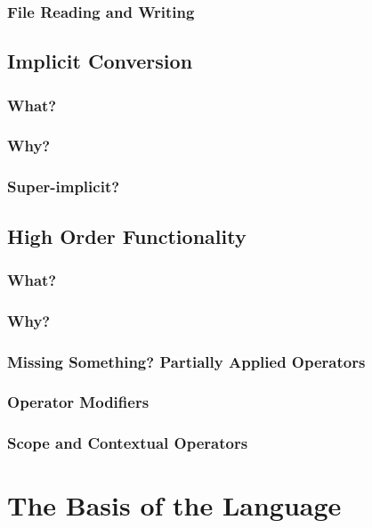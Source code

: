 \documentclass{article}
\let\oldsection\section
\renewcommand{\section}[2]{\oldsection{#1}\label{#2}}
\begin{document}
\subsubsection{File Reading and Writing}

\subsection{Implicit Conversion}
\subsubsection{What?}

\subsubsection{Why?}

\subsubsection{Super-implicit?}

\subsection{High Order Functionality}
\subsubsection{What?}

\subsubsection{Why?}

\subsubsection{Missing Something? Partially Applied Operators}

\subsubsection{Operator Modifiers}

\subsubsection{Scope and Contextual Operators}

\section{The Basis of the Language}{basis}
\end{document}
